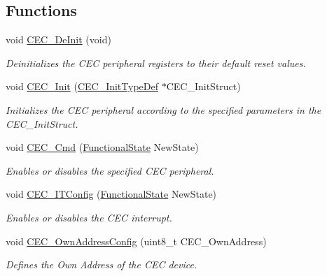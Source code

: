 \subsection*{Functions}
\begin{DoxyCompactItemize}
\item 
void \hyperlink{group___c_e_c___private___functions_ga604c3b15b51a46303c201fa3deac2212}{C\+E\+C\+\_\+\+De\+Init} (void)
\begin{DoxyCompactList}\small\item\em Deinitializes the C\+EC peripheral registers to their default reset values. \end{DoxyCompactList}\item 
void \hyperlink{group___c_e_c___private___functions_gaf48aee745a16370372b3eaa7cf3ed22b}{C\+E\+C\+\_\+\+Init} (\hyperlink{struct_c_e_c___init_type_def}{C\+E\+C\+\_\+\+Init\+Type\+Def} $\ast$C\+E\+C\+\_\+\+Init\+Struct)
\begin{DoxyCompactList}\small\item\em Initializes the C\+EC peripheral according to the specified parameters in the C\+E\+C\+\_\+\+Init\+Struct. \end{DoxyCompactList}\item 
void \hyperlink{group___c_e_c___private___functions_ga0c8efa79e5768930e567b3b3ed6e09e9}{C\+E\+C\+\_\+\+Cmd} (\hyperlink{group___exported__types_gac9a7e9a35d2513ec15c3b537aaa4fba1}{Functional\+State} New\+State)
\begin{DoxyCompactList}\small\item\em Enables or disables the specified C\+EC peripheral. \end{DoxyCompactList}\item 
void \hyperlink{group___c_e_c___private___functions_ga8be87c514505cf82eb29334f054fc0bc}{C\+E\+C\+\_\+\+I\+T\+Config} (\hyperlink{group___exported__types_gac9a7e9a35d2513ec15c3b537aaa4fba1}{Functional\+State} New\+State)
\begin{DoxyCompactList}\small\item\em Enables or disables the C\+EC interrupt. \end{DoxyCompactList}\item 
void \hyperlink{group___c_e_c___private___functions_gacad422ef1f50246b2021b41835b8a95c}{C\+E\+C\+\_\+\+Own\+Address\+Config} (uint8\+\_\+t C\+E\+C\+\_\+\+Own\+Address)
\begin{DoxyCompactList}\small\item\em Defines the Own Address of the C\+EC device. \end{DoxyCompactList}\item 

\end{DoxyCompactItemize}
